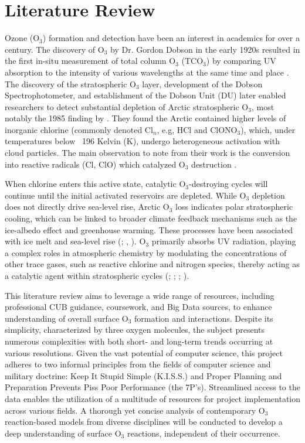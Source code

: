\chapter{Literature Review} \label{chap:litreview} Ozone (O$_3$) formation and detection have been an interest in academics for over a century. The discovery of O$_3$ by Dr. Gordon Dobson in the early 1920s resulted in the first in-situ measurement of total column O$_3$ (TCO$_3$) by comparing UV absorption to the intensity of various wavelengths at the same time and place \parencite{dobson_measurements_1923}. The discovery of the stratospheric O$_3$ layer, development of the Dobson Spectrophotometer, and establishment of the Dobson Unit (DU) later enabled researchers to detect substantial depletion of Arctic stratospheric O$_3$, most notably the 1985 finding by \parencite{farman_large_1985}. They found the Arctic contained higher levels of inorganic chlorine (commonly denoted Cl$_n$, e.g, HCl and ClONO$_3$), which, under temperatures below ~196  Kelvin (K), undergo heterogeneous activation with cloud particles. The main observation to note from their work is the conversion into reactive radicals (Cl, ClO) which catalyzed O$_3$ destruction \parencite{webster_chlorine_1993}. 

When chlorine enters this active state, catalytic O$_3$-destroying cycles will continue until the initial activated reservoirs are depleted. While O$_3$ depletion does not directly drive sea-level rise, Arctic O$_3$ loss indicates polar stratospheric cooling, which can be linked to broader climate feedback mechanisms such as the ice-albedo effect and greenhouse warming. These processes have been associated with ice melt and sea-level rise (\cite{girach_influences_2023}; \cite{minghu_ding_year-round_2020}, \cite{nadzir_spatial-temporal_2018}). O$_3$ primarily absorbs UV radiation, playing a complex roles in atmospheric chemistry by modulating the concentrations of other trace gases, such as reactive chlorine and nitrogen species, thereby acting as a catalytic agent within stratospheric cycles (\cite{farman_large_1985}; \cite{hansen_scientific_2007}; \cite{webster_chlorine_1993}; \cite{he_sensitivity_1999}).

This literature review aims to leverage a wide range of resources, including professional CUB guidance, coursework, and Big Data sources, to enhance understanding of overall surface O$_3$ formation and interactions. Despite its simplicity, characterized by three oxygen molecules, the subject presents numerous complexities with both short- and long-term trends occurring at various resolutions. Given the vast potential of computer science, this project adheres to two informal principles from the fields of computer science and military doctrine: Keep It Stupid Simple (K.I.S.S.) and Proper Planning and Preparation Prevents Piss Poor Performance (the 7P’s). Streamlined access to the data enables the utilization of a multitude of resources for project implementation across various fields. A thorough yet concise analysis of contemporary O$_3$ reaction-based models from diverse disciplines will be conducted to develop a deep understanding of surface O$_3$ reactions, independent of their occurrence. 

